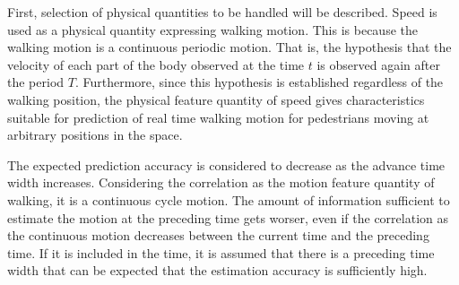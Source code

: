 \documentclass{sigchi}
\begin{document}
First, selection of physical quantities to be handled will be described. Speed is used as a physical quantity expressing walking motion. This is because the walking motion is a continuous periodic motion. That is, the hypothesis that the velocity of each part of the body observed at the time $ t $ is observed again after the period $ T $. Furthermore, since this hypothesis is established regardless of the walking position, the physical feature quantity of speed gives characteristics suitable for prediction of real time walking motion for pedestrians moving at arbitrary positions in the space.

The expected prediction accuracy is considered to decrease as the advance time width increases. Considering the correlation as the motion feature quantity of walking, it is a continuous cycle motion. The amount of information sufficient to estimate the motion at the preceding time gets worser, even if the correlation as the continuous motion decreases between the current time and the preceding time. If it is included in the time, it is assumed that there is a preceding time width that can be expected that the estimation accuracy is sufficiently high. 


%
%
%
%
%
\balance{}
\end{document}
